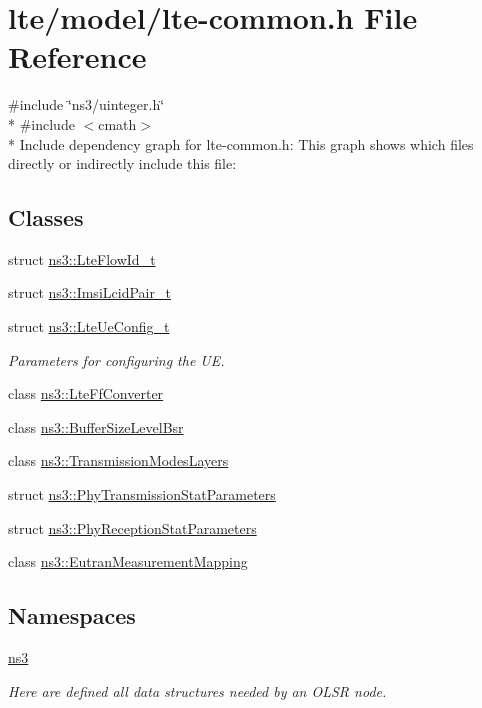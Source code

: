 \hypertarget{lte-common_8h}{}\section{lte/model/lte-\/common.h File Reference}
\label{lte-common_8h}
{\ttfamily \#include \char`\"{}ns3/uinteger.\+h\char`\"{}}\\*
{\ttfamily \#include $<$cmath$>$}\\*
Include dependency graph for lte-\/common.h\+:
This graph shows which files directly or indirectly include this file\+:
\subsection*{Classes}
\begin{DoxyCompactItemize}
\item 
struct \hyperlink{structns3_1_1LteFlowId__t}{ns3\+::\+Lte\+Flow\+Id\+\_\+t}
\item 
struct \hyperlink{structns3_1_1ImsiLcidPair__t}{ns3\+::\+Imsi\+Lcid\+Pair\+\_\+t}
\item 
struct \hyperlink{structns3_1_1LteUeConfig__t}{ns3\+::\+Lte\+Ue\+Config\+\_\+t}
\begin{DoxyCompactList}\small\item\em Parameters for configuring the UE. \end{DoxyCompactList}\item 
class \hyperlink{classns3_1_1LteFfConverter}{ns3\+::\+Lte\+Ff\+Converter}
\item 
class \hyperlink{classns3_1_1BufferSizeLevelBsr}{ns3\+::\+Buffer\+Size\+Level\+Bsr}
\item 
class \hyperlink{classns3_1_1TransmissionModesLayers}{ns3\+::\+Transmission\+Modes\+Layers}
\item 
struct \hyperlink{structns3_1_1PhyTransmissionStatParameters}{ns3\+::\+Phy\+Transmission\+Stat\+Parameters}
\item 
struct \hyperlink{structns3_1_1PhyReceptionStatParameters}{ns3\+::\+Phy\+Reception\+Stat\+Parameters}
\item 
class \hyperlink{classns3_1_1EutranMeasurementMapping}{ns3\+::\+Eutran\+Measurement\+Mapping}
\end{DoxyCompactItemize}
\subsection*{Namespaces}
\begin{DoxyCompactItemize}
\item 
 \hyperlink{namespacens3}{ns3}
\begin{DoxyCompactList}\small\item\em Here are defined all data structures needed by an O\+L\+SR node. \end{DoxyCompactList}\end{DoxyCompactItemize}
